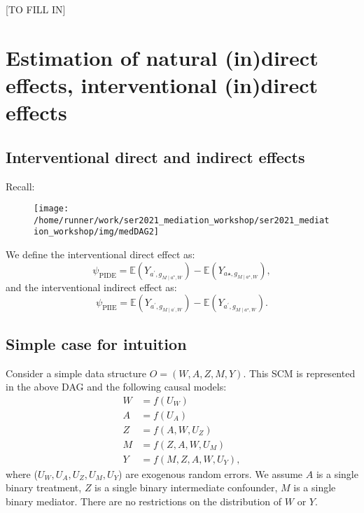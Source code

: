 \documentclass[
  12pt, krantz2,
]{book}
\theoremstyle{definition}
\theoremstyle{definition}
\theoremstyle{definition}
\newcommand{\E}{\mathbb{E}}
\newcommand{\1}{\mathbbm{1}}
\begin{document}
{[}TO FILL IN{]}

\hypertarget{estimation-of-natural-indirect-effects-interventional-indirect-effects}{%
\chapter{Estimation of natural (in)direct effects, interventional (in)direct effects}\label{estimation-of-natural-indirect-effects-interventional-indirect-effects}}

\hypertarget{interventional-direct-and-indirect-effects}{%
\section{Interventional direct and indirect effects}\label{interventional-direct-and-indirect-effects}}

Recall:

\begin{figure}

{\centering \texttt{[image: /home/runner/work/ser2021\_mediation\_workshop/ser2021\_mediation\_workshop/img/medDAG2]} 

}

\end{figure}

We define the interventional direct effect as:
\begin{equation*}
  \psi_{\text{PIDE}} = \E(Y_{a^\prime,g_{M \mid a^\star,W}}) -
    \E(Y_{a\star,g_{M \mid a^\star,W}}),
\end{equation*}
and the interventional indirect effect as:
\begin{equation*}
  \psi_{\text{PIIE}} = \E(Y_{a^\prime,g_{M \mid a^\prime,W}}) -
    \E(Y_{a^\prime,g_{M \mid a^\star,W}}).
\end{equation*}

\hypertarget{simple-case-for-intuition}{%
\section{Simple case for intuition}\label{simple-case-for-intuition}}

Consider a simple data structure \(O=(W, A, Z, M, Y)\). This SCM is represented in
the above DAG and the following causal models:
\begin{align*}
  W &= f(U_W)\\
  A &= f(U_A)\\
  Z &= f(A, W, U_Z)\\
  M &= f(Z, A, W, U_M)\\
  Y &= f(M, Z, A, W, U_Y),
\end{align*}
where (\(U_W, U_A, U_Z, U_M, U_Y\)) are exogenous random errors. We assume \(A\) is
a single binary treatment, \(Z\) is a single binary intermediate confounder, \(M\)
is a single binary mediator. There are no restrictions on the distribution of
\(W\) or \(Y\).
\end{document}
